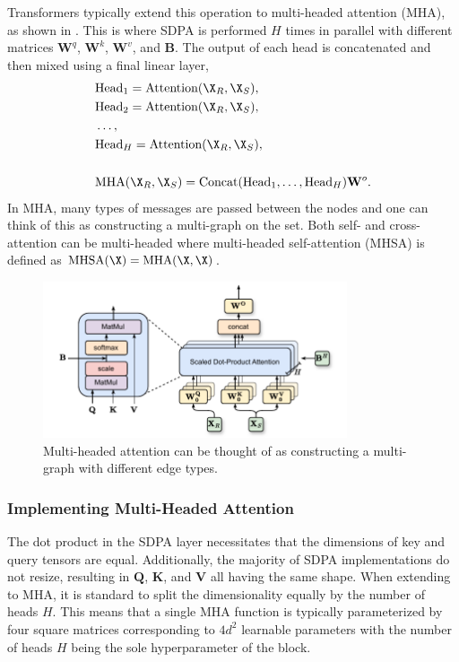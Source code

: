 Transformers typically extend this operation to multi-headed attention (MHA), as shown in .
This is where SDPA is performed $H$ times in parallel with different matrices $\mathbf{W}^q$, $\mathbf{W}^k$, $\mathbf{W}^v$, and $\mathbf{B}$.
The output of each head is concatenated and then mixed using a final linear layer,
\begin{equation}
    \begin{aligned}
    & \text{Head}_1 = \text{Attention}(\X_R, \X_S), \\
    & \text{Head}_2 = \text{Attention}(\X_R, \X_S), \\
    & \ldots, \\
    & \text{Head}_H = \text{Attention}(\X_R, \X_S), \\
    \vphantom{x} \\
    & \text{MHA}(\X_R, \X_S) = \text{Concat}(\text{Head}_1, \ldots, \text{Head}_H) \mathbf{W}^o.
    \end{aligned}
\end{equation}
In MHA, many types of messages are passed between the nodes and one can think of this as constructing a multi-graph on the set.
Both self- and cross-attention can be multi-headed where multi-headed self-attention (MHSA) is defined as $\text{MHSA}(\X) = \text{MHA}(\X, \X)$.

\begin{figure}
    \centering
    \includegraphics[width=0.8\textwidth]{Figures/graph_networks/mha.pdf}
    \caption{Multi-headed attention can be thought of as constructing a multi-graph with different edge types.}
    \label{fig:mha}
\end{figure}

\subsubsection{Implementing Multi-Headed Attention}

The dot product in the SDPA layer necessitates that the dimensions of key and query tensors are equal.
Additionally, the majority of SDPA implementations do not resize, resulting in $\mathbf{Q}$, $\mathbf{K}$, and $\mathbf{V}$ all having the same shape.
When extending to MHA, it is standard to split the dimensionality equally by the number of heads $H$.
This means that a single MHA function is typically parameterized by four square matrices corresponding to $4d^2$ learnable parameters with the number of heads $H$ being the sole hyperparameter of the block.

